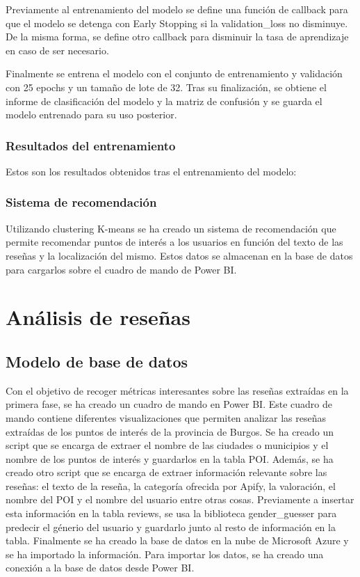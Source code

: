 Previamente al entrenamiento del modelo se define una función de callback para que el modelo se detenga con Early Stopping si la validation\_loss no disminuye. 
De la misma forma, se define otro callback para disminuir la tasa de aprendizaje en caso de ser necesario.

Finalmente se entrena el modelo con el conjunto de entrenamiento y validación con 25 epochs y un tamaño de lote de 32.
Tras su finalización, se obtiene el informe de clasificación del modelo y la matriz de confusión y se guarda el modelo entrenado para su uso posterior.

\subsubsection{Resultados del entrenamiento}

Estos son los resultados obtenidos tras el entrenamiento del modelo:


\subsubsection{Sistema de recomendación}

Utilizando clustering K-means se ha creado un sistema de recomendación que permite recomendar puntos de interés a los usuarios en función del texto de las reseñas y la localización del mismo.
Estos datos se almacenan en la base de datos para cargarlos sobre el cuadro de mando de Power BI.

\section{Análisis de reseñas}

\subsection{Modelo de base de datos}

Con el objetivo de recoger métricas interesantes sobre las reseñas extraídas en la primera fase, se ha creado un cuadro de mando en Power BI.
Este cuadro de mando contiene diferentes visualizaciones que permiten analizar las reseñas extraídas de los puntos de interés de la provincia de Burgos.
Se ha creado un script que se encarga de extraer el nombre de las ciudades o municipios y el nombre de los puntos de interés y guardarlos en la tabla POI.
Además, se ha creado otro script que se encarga de extraer información relevante sobre las reseñas: el texto de la reseña, la categoría ofrecida por Apify, la valoración, el nombre del POI y el nombre del usuario entre otras cosas.
Previamente a insertar esta información en la tabla reviews, se usa la biblioteca gender\_guesser para predecir el génerio del usuario y guardarlo junto al resto de información en la tabla.
Finalmente se ha creado la base de datos en la nube de Microsoft Azure y se ha importado la información.
Para importar los datos, se ha creado una conexión a la base de datos desde Power BI.

